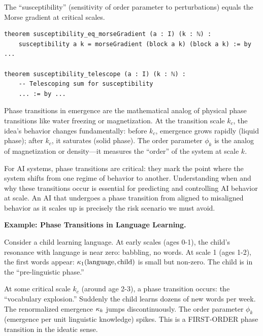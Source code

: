\begin{theorem}
\label{thm:susceptibility-morse}
The ``susceptibility'' (sensitivity of order parameter to perturbations) equals
the Morse gradient at critical scales.
\end{theorem}

\begin{lstlisting}[caption={Susceptibility (IDT\_v3\_Emergence.lean)}]
theorem susceptibility_eq_morseGradient (a : I) (k : ℕ) :
    susceptibility a k = morseGradient (block a k) (block a k) := by ...

theorem susceptibility_telescope (a : I) (k : ℕ) :
    -- Telescoping sum for susceptibility
    ... := by ...
\end{lstlisting}

\begin{interpretation}
Phase transitions in emergence are the mathematical analog of physical phase
transitions like water freezing or magnetization. At the transition scale $k_c$,
the idea's behavior changes fundamentally: before $k_c$, emergence grows rapidly
(liquid phase); after $k_c$, it saturates (solid phase). The order parameter
$\phi_k$ is the analog of magnetization or density---it measures the ``order''
of the system at scale $k$.

For AI systems, phase transitions are critical: they mark the point where the
system shifts from one regime of behavior to another. Understanding when and
why these transitions occur is essential for predicting and controlling AI
behavior at scale. An AI that undergoes a phase transition from aligned to
misaligned behavior as it scales up is precisely the risk scenario we must avoid.

\textbf{Example: Phase Transitions in Language Learning.}

Consider a child learning language. At early scales (ages 0-1), the child's
resonance with language is near zero: babbling, no words. At scale 1 (ages 1-2),
the first words appear: $\kappa_1(\text{language}, \text{child})$ is small but
non-zero. The child is in the ``pre-linguistic phase.''

At some critical scale $k_c$ (around age 2-3), a phase transition occurs: the
``vocabulary explosion.'' Suddenly the child learns dozens of new words per week.
The renormalized emergence $\kappa_k$ jumps discontinuously. The order parameter
$\phi_k$ (emergence per unit linguistic knowledge) spikes. This is a FIRST-ORDER
phase transition in the ideatic sense.


\end{interpretation}
